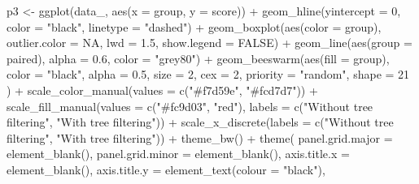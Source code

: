 \documentclass[
  11pt,
  oneside]{book}
\newenvironment{Shaded}{\begin{snugshade}}{\end{snugshade}}
\newcommand{\AttributeTok}[1]{\textcolor[rgb]{0.77,0.63,0.00}{#1}}
\newcommand{\ConstantTok}[1]{\textcolor[rgb]{0.00,0.00,0.00}{#1}}
\newcommand{\DecValTok}[1]{\textcolor[rgb]{0.00,0.00,0.81}{#1}}
\newcommand{\FloatTok}[1]{\textcolor[rgb]{0.00,0.00,0.81}{#1}}
\newcommand{\FunctionTok}[1]{\textcolor[rgb]{0.00,0.00,0.00}{#1}}
\newcommand{\NormalTok}[1]{#1}
\newcommand{\OtherTok}[1]{\textcolor[rgb]{0.56,0.35,0.01}{#1}}
\newcommand{\SpecialCharTok}[1]{\textcolor[rgb]{0.00,0.00,0.00}{#1}}
\newcommand{\StringTok}[1]{\textcolor[rgb]{0.31,0.60,0.02}{#1}}
\begin{document}
\begin{Shaded}
\begin{Highlighting}[]
\NormalTok{p3 }\OtherTok{\textless{}{-}} \FunctionTok{ggplot}\NormalTok{(data\_, }\FunctionTok{aes}\NormalTok{(}\AttributeTok{x =}\NormalTok{ group, }\AttributeTok{y =}\NormalTok{ score)) }\SpecialCharTok{+}
  \FunctionTok{geom\_hline}\NormalTok{(}\AttributeTok{yintercept =} \DecValTok{0}\NormalTok{, }\AttributeTok{color =} \StringTok{"black"}\NormalTok{, }\AttributeTok{linetype =} \StringTok{"dashed"}\NormalTok{) }\SpecialCharTok{+}
  \FunctionTok{geom\_boxplot}\NormalTok{(}\FunctionTok{aes}\NormalTok{(}\AttributeTok{color =}\NormalTok{ group), }\AttributeTok{outlier.color =} \ConstantTok{NA}\NormalTok{, }\AttributeTok{lwd =} \FloatTok{1.5}\NormalTok{, }\AttributeTok{show.legend =} \ConstantTok{FALSE}\NormalTok{) }\SpecialCharTok{+}
  \FunctionTok{geom\_line}\NormalTok{(}\FunctionTok{aes}\NormalTok{(}\AttributeTok{group =}\NormalTok{ paired), }\AttributeTok{alpha =} \FloatTok{0.6}\NormalTok{, }\AttributeTok{color =} \StringTok{"grey80"}\NormalTok{) }\SpecialCharTok{+}
  \FunctionTok{geom\_beeswarm}\NormalTok{(}\FunctionTok{aes}\NormalTok{(}\AttributeTok{fill =}\NormalTok{ group),}
    \AttributeTok{color =} \StringTok{"black"}\NormalTok{, }\AttributeTok{alpha =} \FloatTok{0.5}\NormalTok{, }\AttributeTok{size =} \DecValTok{2}\NormalTok{, }\AttributeTok{cex =} \DecValTok{2}\NormalTok{, }\AttributeTok{priority =} \StringTok{"random"}\NormalTok{,}
    \AttributeTok{shape =} \DecValTok{21}
\NormalTok{  ) }\SpecialCharTok{+}
  \FunctionTok{scale\_color\_manual}\NormalTok{(}\AttributeTok{values =} \FunctionTok{c}\NormalTok{(}\StringTok{"\#f7d59e"}\NormalTok{, }\StringTok{"\#fcd7d7"}\NormalTok{)) }\SpecialCharTok{+}
  \FunctionTok{scale\_fill\_manual}\NormalTok{(}\AttributeTok{values =} \FunctionTok{c}\NormalTok{(}\StringTok{"\#fc9d03"}\NormalTok{, }\StringTok{"red"}\NormalTok{), }\AttributeTok{labels =} \FunctionTok{c}\NormalTok{(}\StringTok{"Without tree filtering"}\NormalTok{, }\StringTok{"With tree filtering"}\NormalTok{)) }\SpecialCharTok{+}
  \FunctionTok{scale\_x\_discrete}\NormalTok{(}\AttributeTok{labels =} \FunctionTok{c}\NormalTok{(}\StringTok{"Without tree filtering"}\NormalTok{, }\StringTok{"With tree filtering"}\NormalTok{)) }\SpecialCharTok{+}
  \FunctionTok{theme\_bw}\NormalTok{() }\SpecialCharTok{+}
  \FunctionTok{theme}\NormalTok{(}
    \AttributeTok{panel.grid.major =} \FunctionTok{element\_blank}\NormalTok{(),}
    \AttributeTok{panel.grid.minor =} \FunctionTok{element\_blank}\NormalTok{(),}
    \AttributeTok{axis.title.x =} \FunctionTok{element\_blank}\NormalTok{(),}
    \AttributeTok{axis.title.y =} \FunctionTok{element\_text}\NormalTok{(}\AttributeTok{colour =} \StringTok{"black"}\NormalTok{),}

\end{Highlighting}
\end{Shaded}
\end{document}
